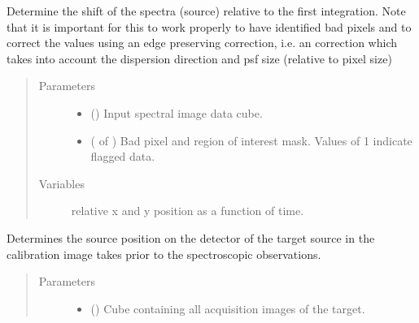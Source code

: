 \documentclass[a4paper,10pt,english]{sphinxmanual}
\begin{document}
\begin{fulllineitems}
\begin{fulllineitems}
\label{\detokenize{cascade.instruments:cascade.instruments.instruments.HSTWFC3._determine_relative_source_position}}
Determine the shift of the spectra (source) relative to the first
integration. Note that it is important for this to work properly
to have identified bad pixels and to correct the values using an edge
preserving correction, i.e. an correction which takes into account
the dispersion direction and psf size (relative to pixel size)
\begin{quote}\begin{description}
\item[{Parameters}] \leavevmode\begin{itemize}
\item {} 
 () \textendash{} Input spectral image data cube.

\item {} 
 ( of ) \textendash{} Bad pixel and region of interest mask. Values of 1 indicate
flagged data.

\end{itemize}

\item[{Variables}] \leavevmode
{} \textendash{} relative x and y position as a function of time.

\end{description}\end{quote}

\end{fulllineitems}


\begin{fulllineitems}
\label{\detokenize{cascade.instruments:cascade.instruments.instruments.HSTWFC3._determine_source_position_from_cal_image}}
Determines the source position on the detector of the target source in
the calibration image takes prior to the spectroscopic observations.
\begin{quote}\begin{description}
\item[{Parameters}] \leavevmode\begin{itemize}
\item {} 
 () \textendash{} Cube containing all acquisition images of the target.


\end{itemize}
\end{description}
\end{quote}
\end{fulllineitems}
\end{fulllineitems}
\end{document}
